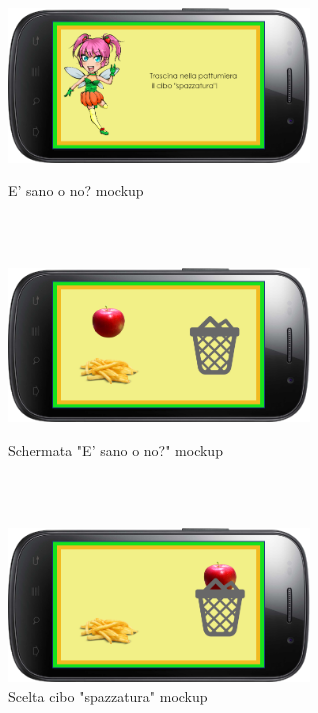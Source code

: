 \begin{figure}
 \begin{minipage}[c]{\columnwidth}
   \centering
   \includegraphics[width=8cm]{Images/Mockup/gioco2}
   \caption{E' sano o no? mockup}
   \label{fig:E' sano o no?}
 \end{minipage}
 \ \hspace{8mm} \hspace{8mm} \\\
 
 \begin{minipage}[c]{\columnwidth}
  \centering
   \includegraphics[width=8cm]{Images/Mockup/sano}
   \caption{Schermata "E' sano o no?" mockup}
   \label{fig:Schermata "E' sano o no?"}
 \end{minipage}
 \ \hspace{8mm} \hspace{8mm} \\\
 
 \begin{minipage}[c]{\columnwidth}
  \centering
   \includegraphics[width=8cm]{Images/Mockup/sanoscelta}
   \caption{Scelta cibo "spazzatura" mockup}
   \label{fig:Scelta "E' sano o no?"}
 \end{minipage}
\end{figure}
\clearpage

